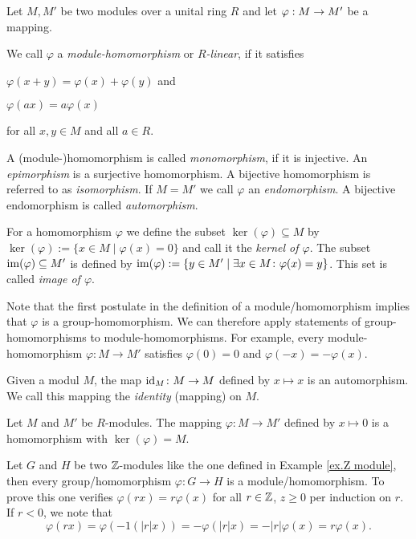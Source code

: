  \begin{defin}
Let $M,M'$ be two modules over a unital ring $R$ and let $\varphi : M \rightarrow M'$ be a mapping. 
\begin{thmlist}
\item We call $\varphi$ a \emph{module-homomorphism} or \textit{$R$-linear}, if it satisfies
\begin{exlist}
\item $\varphi(x+y)=\varphi(x)+\varphi(y)$ and
\item $\varphi(ax)=a\varphi(x)$
\end{exlist}
for all $x,y \in M$ and all $a \in R$.
\item A (module-)homomorphism is called \textit{monomorphism}, if it is injective. An \emph{epimorphism} is a surjective homomorphism. A bijective homomorphism is referred to as \textit{isomorphism}. If $M=M'$ we call $\varphi$ an \textit{endomorphism}. A bijective endomorphism is called \textit{automorphism}.
\item For a homomorphism $\varphi$ we define the subset $\ker(\varphi)\subseteq M$ by $\ker(\varphi):=\lbrace x\in M \mid \varphi(x)=0\rbrace$ and call it the \emph{kernel of $\varphi$}. The subset $\operatorname{im}(\varphi)\subseteq M'$ is defined by $\operatorname{im}(\varphi):=\lbrace y\in M' \mid \exists x\in M\colon \varphi(x)=y\rbrace$. This set is called \emph{image of $\varphi$}.
\end{thmlist}
\end{defin}

Note that the first postulate in the definition of a module\-/homomorphism implies that $\varphi$ is a group-homomorphism. We can therefore apply statements of group-homomorphisms to mo\-dule-ho\-mo\-morph\-isms. For example, every mo\-dule-ho\-mo\-morph\-ism $\varphi\colon M\rightarrow M'$ satisfies $\varphi(0)=0$ and $\varphi(-x)=-\varphi(x)$.

\begin{exam}
\begin{exlist}
\item Given a modul $M$, the map $\operatorname{id}_M\colon M \rightarrow M$ defined by $x\mapsto x$ is an automorphism. We  call this mapping the \emph{identity} (mapping) on $M$.
\item Let $M$ and $M'$ be $R$-modules. The mapping $\varphi\colon M\rightarrow M'$ defined by $x\mapsto 0$ is a homomorphism with $\ker(\varphi)=M$. 
\item Let $G$ and $H$ be two $\operatorname{\mathbb{Z}}$-modules like the one defined in Example \ref{ex.Z module}, then every group\-/homomorphism $\varphi\colon G\rightarrow H$ is a module\-/homomorphism. %
To prove this one verifies $\varphi(rx)=r\varphi(x)$ for all $r\in\operatorname{\mathbb{Z}}$, $z\geq 0$ per induction on $r$. If $r<0$, we note that 
\begin{equation*}
\varphi(rx)=\varphi(-1(\lvert r\rvert x))=-\varphi(\lvert r\rvert x)=-\lvert r\rvert\varphi(x)=r\varphi(x).
\end{equation*}
\end{exlist}
\end{exam}

